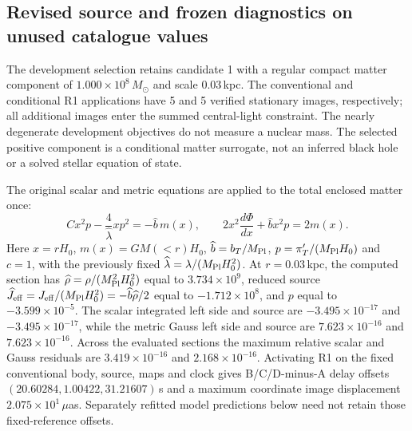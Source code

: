 \subsection{Revised source and frozen diagnostics on unused catalogue values}
\label{sec:he0435-revised-results}
The development selection retains candidate 1 with a regular compact matter component of \(1.000\times10^{8}\)\,$M_\odot$ and scale 0.03\,kpc.
The conventional and conditional R1 applications have 5 and 5 verified stationary images, respectively; all additional images enter the summed central-light constraint.
The nearly degenerate development objectives do not measure a nuclear mass. The selected positive component is a conditional matter surrogate, not an inferred black hole or a solved stellar equation of state.

The original scalar and metric equations are applied to the total enclosed matter once:
\[ Cx^2p-\frac{4}{\widehat\lambda}xp^2=-\widehat b\,m(x),\qquad 2x^2\frac{d\Phi}{dx}+\widehat b x^2p=2m(x). \]
Here $x=rH_0$, $m(x)=GM(<r)H_0$, $\widehat b=b_T/M_{\rm Pl}$, $p=\pi_T^{\prime}/(M_{\rm Pl}H_0)$ and $c=1$, with the previously fixed $\widehat\lambda=\lambda/(M_{\rm Pl}H_0^2)$.
At $r=0.03$\,kpc, the computed section has $\widehat\rho=\rho/(M_{\rm Pl}^2H_0^2)$ equal to \(3.734\times10^{9}\), reduced source $\widehat J_{\rm eff}=J_{\rm eff}/(M_{\rm Pl}H_0^2)=-\widehat b\widehat\rho/2$ equal to \(-1.712\times10^{8}\), and $p$ equal to \(-3.599\times10^{-5}\).
The scalar integrated left side and source are \(-3.495\times10^{-17}\) and \(-3.495\times10^{-17}\), while the metric Gauss left side and source are \(7.623\times10^{-16}\) and \(7.623\times10^{-16}\).
Across the evaluated sections the maximum relative scalar and Gauss residuals are \(3.419\times10^{-16}\) and \(2.168\times10^{-16}\).
Activating R1 on the fixed conventional body, source, maps and clock gives B/C/D-minus-A delay offsets $(20.60284,1.00422,31.21607)$\,s and a maximum coordinate image displacement \(2.075\times10^{1}\)\,$\mu$as. Separately refitted model predictions below need not retain those fixed-reference offsets.

